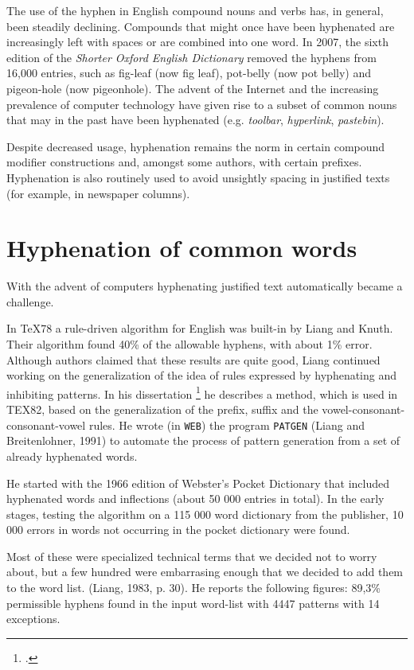 The use of the hyphen in English compound nouns and verbs has, in general, been steadily declining. Compounds that might once have been hyphenated are increasingly left with spaces or are combined into one word. In 2007, the sixth edition of the \textit{Shorter Oxford English Dictionary} removed the hyphens from 16,000 entries, such as fig-leaf (now fig leaf), pot-belly (now pot belly) and pigeon-hole (now pigeonhole). The advent of the Internet and the increasing prevalence of computer technology have given rise to a subset of common nouns that may in the past have been hyphenated (e.g. \textit{toolbar}, \textit{hyperlink}, \textit{pastebin}).

Despite decreased usage, hyphenation remains the norm in certain compound modifier constructions and, amongst some authors, with certain prefixes. Hyphenation is also routinely used to avoid unsightly spacing in justified texts (for example, in newspaper columns). 

\section{Hyphenation of common words}
With the advent of computers hyphenating justified text automatically became a challenge.


In \TeX78 a rule-driven algorithm for English   
was built-in by Liang and Knuth. Their algorithm
found 40\% of the allowable hyphens, with
about 1\% error. Although authors
claimed that these results are quite good, Liang
continued working on the generalization of the idea
of rules expressed by hyphenating and inhibiting
patterns. In his dissertation \footcite{liang83} he describes
a method, which is used in TEX82, based
on the generalization of the prefix, suffix and the
vowel-consonant-consonant-vowel rules. He wrote
(in \texttt{WEB}) the program \texttt{PATGEN} (Liang and Breitenlohner,
1991) to automate the process of pattern 
generation from a set of already hyphenated words.

He started with the 1966 edition of Webster's Pocket\cite{websters1961}
Dictionary that included hyphenated words and inflections
 (about 50 000 entries in total). In the early
stages, testing the algorithm on a 115 000 word dictionary
from the publisher, 10 000 errors in words
not occurring in the pocket dictionary were found.

Most of these were specialized technical terms that
we decided not to worry about, but a few hundred
were embarrasing enough that we decided to add
them to the word list. (Liang, 1983, p. 30). He
reports the following figures: 89,3\% permissible hyphens
found in the input word-list with 4447 patterns
with 14 exceptions.

